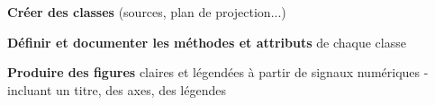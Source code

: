 \item \textbf{Créer des classes} (sources, plan de projection...)
\item \textbf{Définir et documenter les méthodes et attributs} de chaque classe
\item \textbf{Produire des figures} claires et légendées à partir de signaux numériques - incluant un titre, des axes, des légendes
